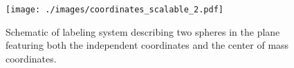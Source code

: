 \documentclass[prbg,preprint]{revtex4-1}
\begin{document}






\begin{figure}[h]
  \centering
  \texttt{[image: ./images/coordinates\_scalable\_2.pdf]}
  \caption{Schematic of labeling system describing two spheres in the plane featuring both the independent coordinates and the center of mass coordinates.}
\end{figure}
\end{document}
